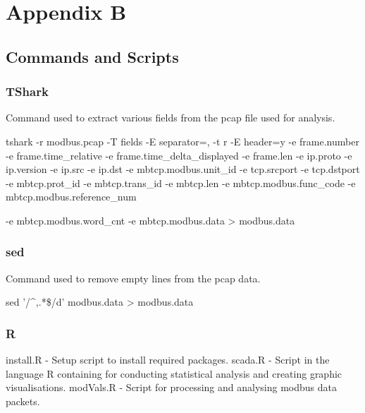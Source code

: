 \documentclass[]{article}
\begin{document}
\pagebreak

\section{Appendix B}\label{appendix-b}

\subsection{Commands and Scripts}\label{commands-and-scripts}

\subsubsection{TShark}\label{tshark}

Command used to extract various fields from the pcap file used for
analysis.

tshark -r modbus.pcap -T fields -E separator=, -t r -E header=y -e
frame.number -e frame.time\_relative -e frame.time\_delta\_displayed -e
frame.len -e ip.proto -e ip.version -e ip.src -e ip.dst -e
mbtcp.modbus.unit\_id -e tcp.srcport -e tcp.dstport -e mbtcp.prot\_id -e
mbtcp.trans\_id -e mbtcp.len -e mbtcp.modbus.func\_code -e
mbtcp.modbus.reference\_num

-e mbtcp.modbus.word\_cnt -e mbtcp.modbus.data \textgreater{}
modbus.data

\subsubsection{sed}\label{sed}

Command used to remove empty lines from the pcap data.

sed '/\^{},.*\$/d' modbus.data \textgreater{} modbus.data

\subsubsection{R}\label{r}

install.R - Setup script to install required packages. scada.R - Script
in the language R containing for conducting statistical analysis and
creating graphic visualisations. modVals.R - Script for processing and
analysing modbus data packets.
\end{document}
